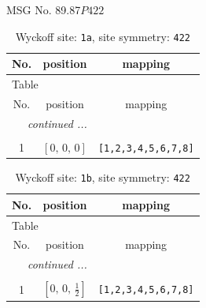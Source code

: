 \documentclass[fleqn,8pt]{jsarticle}
\begin{document}
\setcounter{MaxMatrixCols}{32}

\renewcommand{\tablename}{Table~}
\renewcommand{\figurename}{Figure~}
\begin{center}
\LARGE
MSG No. 89.87\quad$P422$
\end{center}
\renewcommand{\arraystretch}{1.2}
\begin{longtable}{ccc}
\caption{Wyckoff site: {\tt 1a}, site symmetry: {\tt 422}}
 \\
 \hline \hline
No. & position & mapping \\ \hline \endfirsthead

\multicolumn{2}{l}{\tablename\ \thetable{}} \\
 \hline \hline
No. & position & mapping \\ \hline \endhead

 \hline \hline
\multicolumn{2}{r}{\footnotesize\it continued ...} \\ \endfoot

 \hline \hline
\multicolumn{2}{r}{} \\ \endlastfoot

1 & $\left[ 0,\, 0,\, 0 \right]$ & {\tt [1,2,3,4,5,6,7,8]} \\
\end{longtable}
\renewcommand{\arraystretch}{1.2}
\begin{longtable}{ccc}
\caption{Wyckoff site: {\tt 1b}, site symmetry: {\tt 422}}
 \\
 \hline \hline
No. & position & mapping \\ \hline \endfirsthead

\multicolumn{2}{l}{\tablename\ \thetable{}} \\
 \hline \hline
No. & position & mapping \\ \hline \endhead

 \hline \hline
\multicolumn{2}{r}{\footnotesize\it continued ...} \\ \endfoot

 \hline \hline
\multicolumn{2}{r}{} \\ \endlastfoot

1 & $\left[ 0,\, 0,\, \frac{1}{2} \right]$ & {\tt [1,2,3,4,5,6,7,8]} \\
\end{longtable}
\renewcommand{\arraystretch}{1.2}
\end{document}
